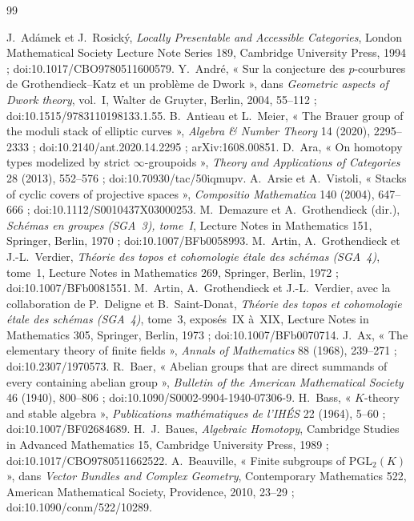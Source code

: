 \documentclass[11pt]{article}
\theoremstyle{plain}
\theoremstyle{definition}
\theoremstyle{plain}
\theoremstyle{definition}
\theoremstyle{remark}
\renewcommand{\_}{\bkunderscore\allowbreak}
\begin{document}
\begin{thebibliography}{99}\small\raggedright
{} J.~Adámek et J.~Rosický, \emph{Locally Presentable and Accessible Categories}, London Mathematical Society Lecture Note Series 189, Cambridge University Press, 1994 ; doi:10.1017/CBO9780511600579.
 Y.~André, « Sur la conjecture des $p$-courbures de Grothendieck--Katz et un problème de Dwork », dans \emph{Geometric aspects of Dwork theory}, vol.~I, Walter de Gruyter, Berlin, 2004, 55--112 ; doi:10.1515/9783110198133.1.55.
 B.~Antieau et L.~Meier, « The Brauer group of the moduli stack of elliptic curves », \emph{Algebra \& Number Theory} 14 (2020), 2295--2333 ; doi:10.2140/ant.2020.14.2295 ; arXiv:1608.00851.
 D.~Ara, « On homotopy types modelized by strict $\infty$-groupoids », \emph{Theory and Applications of Categories} 28 (2013), 552--576 ; doi:10.70930/tac/50iqmupv.
 A.~Arsie et A.~Vistoli, « Stacks of cyclic covers of projective spaces », \emph{Compositio Mathematica} 140 (2004), 647--666 ; doi:10.1112/S0010437X03000253.
 M.~Demazure et A.~Grothendieck (dir.), \emph{Schémas en groupes (SGA~3), tome~I}, Lecture Notes in Mathematics 151, Springer, Berlin, 1970 ; doi:10.1007/BFb0058993.
 M.~Artin, A.~Grothendieck et J.-L.~Verdier, \emph{Théorie des topos et cohomologie étale des schémas (SGA~4)}, tome~1, Lecture Notes in Mathematics 269, Springer, Berlin, 1972 ; doi:10.1007/BFb0081551.
 M.~Artin, A.~Grothendieck et J.-L.~Verdier, avec la collaboration de P.~Deligne et B.~Saint-Donat, \emph{Théorie des topos et cohomologie étale des schémas (SGA~4)}, tome~3, exposés~IX à~XIX, Lecture Notes in Mathematics 305, Springer, Berlin, 1973 ; doi:10.1007/BFb0070714.
 J.~Ax, « The elementary theory of finite fields », \emph{Annals of Mathematics} 88 (1968), 239--271 ; doi:10.2307/1970573.
 R.~Baer, « Abelian groups that are direct summands of every containing abelian group », \emph{Bulletin of the American Mathematical Society} 46 (1940), 800--806 ; doi:10.1090/S0002-9904-1940-07306-9.
 H.~Bass, « $K$-theory and stable algebra », \emph{Publications mathématiques de l'IHÉS} 22 (1964), 5--60 ; doi:10.1007/BF02684689.
 H.~J.~Baues, \emph{Algebraic Homotopy}, Cambridge Studies in Advanced Mathematics 15, Cambridge University Press, 1989 ; doi:10.1017/CBO9780511662522.
 A.~Beauville, « Finite subgroups of $\mathrm{PGL}_2(K)$ », dans \emph{Vector Bundles and Complex Geometry}, Contemporary Mathematics 522, American Mathematical Society, Providence, 2010, 23--29 ; doi:10.1090/conm/522/10289.

\end{thebibliography}
\end{document}
